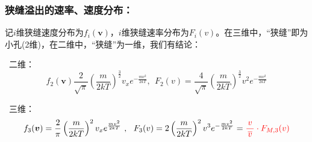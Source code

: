 \documentclass[zihao=5,UTF8]{report}
\begin{document}
\subsubsection{狭缝溢出的速率、速度分布：}
记$i$维狭缝速度分布为$f_{i}(\boldsymbol{v})$，$i$维狭缝速率分布为$F_{i}(v)$。在三维中，“狭缝”即为小孔(2维)，在二维中，“狭缝”为一维，我们有结论：\par
{}\ 二维：
\begin{equation}
    f_2(\boldsymbol{v})\frac{2}{\sqrt{\pi}} \left(\frac{m}{2kT}\right)^{\frac{3}{2}}v_xe^{-\frac{mv^2}{2kT}}, \ \ F_2(v) = \frac{4}{\sqrt{\pi}}\left(\frac{m}{2kT} \right)^{\frac{3}{2}}v^2e^{-\frac{mv^2}{2kT}}
\end{equation}
\par
{}\ 三维：
\begin{equation}
    f_3(\boldsymbol{v}) = \frac{2}{\pi} \left( \frac{m}{2kT}\right)^2 v_x e^{\frac{mv^2}{2kT}}\ ,\ \ F_3(v) = 2\left(\frac{m}{2kT} \right)^2 v^3 e^{-\frac{mv^2}{2kT}} = \textcolor{red}{\frac{v}{\,\overline{v}\,}\cdot F_{M,3}(v)}
\end{equation}
\end{document}
